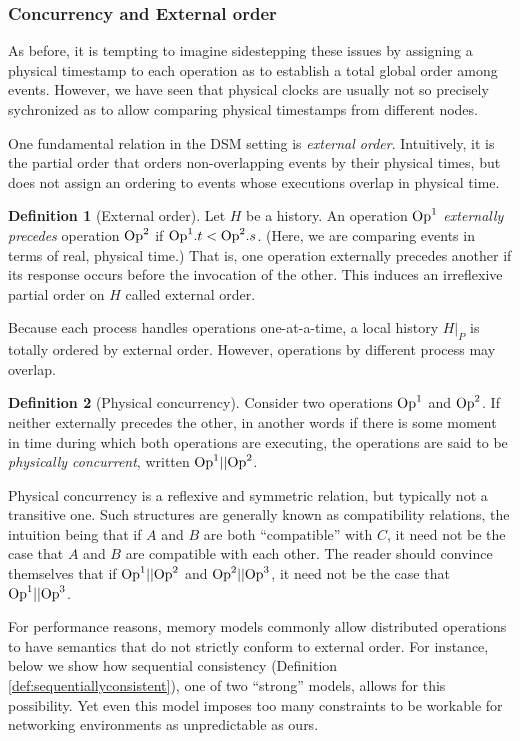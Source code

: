 \documentclass[]             %
{NASA}                       %
\theoremstyle{definition}
\newtheorem{definition}{Definition}[section]
\begin{document}
\subsubsection{Concurrency and External order}
\label{sssec:externalorder}
As before, it is tempting to imagine sidestepping these issues by
assigning a physical timestamp to each operation as to establish a
total global order among events. However, we have seen that physical
clocks are usually not so precisely sychronized as to allow comparing
physical timestamps from different nodes.

One fundamental relation in the DSM setting is \emph{external
order}. Intuitively, it is the partial order that orders
non-overlapping events by their physical times, but does not assign an
ordering to events whose executions overlap in physical time.

\begin{definition}[External order]
  Let $H$ be a history. An operation $\mathrm{Op}^1$ \emph{externally
    precedes} operation $\mathrm{Op}^2$ if $\mathrm{Op}^1.t < \mathrm{Op}^2.s$. (Here, we are
  comparing events in terms of real, physical time.) That is, one
  operation externally precedes another if its response occurs before
  the invocation of the other. This induces an irreflexive partial
  order on $H$ called external order.
\end{definition}

Because each process handles operations one-at-a-time, a local history
$H|_P$ is totally ordered by external order. However, operations by
different process may overlap.

\begin{definition}[Physical concurrency]
  Consider two operations $\mathrm{Op}^1$ and $\mathrm{Op}^2$. If neither externally
  precedes the other, in another words if there is some moment in time
  during which both operations are executing, the operations are said
  to be \emph{physically concurrent}, written $\mathrm{Op}^1 || \mathrm{Op}^2$.
\end{definition}

Physical concurrency is a reflexive and symmetric relation, but
typically not a transitive one. Such structures are generally known as
compatibility relations, the intuition being that if \(A\) and \(B\) are
both ``compatible'' with \(C\), it need not be the case that \(A\) and
\(B\) are compatible with each other. The reader should convince
themselves that if $\mathrm{Op}^1 || \mathrm{Op}^2$ and $\mathrm{Op}^2 || \mathrm{Op}^3$, it need not
be the case that $\mathrm{Op}^1 || \mathrm{Op}^3$.

For performance reasons, memory models commonly allow distributed
operations to have semantics that do not strictly conform to external
order. For instance, below we show how sequential consistency
(Definition \ref{def:sequentiallyconsistent}), one of two ``strong''
models, allows for this possibility. Yet even this model imposes too
many constraints to be workable for networking environments as
unpredictable as ours.
\end{document}
